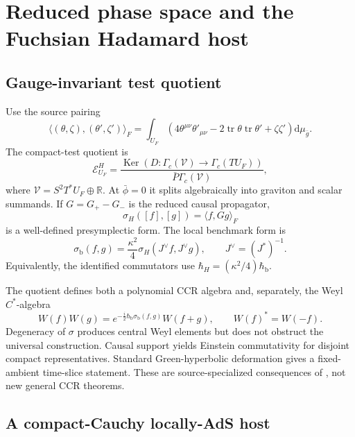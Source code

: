 \documentclass[11pt]{article}
\theoremstyle{definition}
\theoremstyle{remark}
\newcommand{\U}{U_{F}}
\newcommand{\gbar}{\bar g}
\newcommand{\dd}{\mathrm d}
\newcommand{\Ker}{\operatorname{Ker}}
\newcommand{\cE}{\mathcal E}
\newcommand{\cV}{\mathcal V}
\newcommand{\hbarLB}{\hbar_{\mathrm{b}}}
\begin{document}
\section{Reduced phase space and the Fuchsian Hadamard host}

\subsection{Gauge-invariant test quotient}

Use the source pairing
\begin{equation}
 \langle(\theta,\zeta),(\theta',\zeta')\rangle_F
 =\int_{\U}\left(4\theta^{\mu\nu}\theta'_{\mu\nu}
 -2\operatorname{tr}\theta\operatorname{tr}\theta'+\zeta\zeta'\right)
 \dd\mu_{\gbar}.
 \label{eq:sourcepair}
\end{equation}
The compact-test quotient is
\begin{equation}
 \cE^H_{\U}=\frac{\Ker(D:\Gamma_c(\cV)\to\Gamma_c(T\U))}
 {\bar P\Gamma_c(\cV)},
 \label{eq:testquotient}
\end{equation}
where $\cV=S^2T^*\U\oplus\mathbb R$.  At $\bar\phi=0$ it splits algebraically into
graviton and scalar summands.  If $G=G_+-G_-$ is the reduced causal propagator,
\begin{equation}
 \sigma_H([f],[g])=\langle f,Gg\rangle_F
 \label{eq:sigmaH}
\end{equation}
is a well-defined presymplectic form.  The local benchmark form is
\begin{equation}
 \sigma_{\mathrm{b}}(f,g)=\frac{\kappa^2}{4}
 \sigma_H(J^\vee f,J^\vee g),
 \qquad J^\vee=(J^*)^{-1}.
 \label{eq:sigmaLB}
\end{equation}
Equivalently, the identified commutators use
$\hbar_H=(\kappa^2/4)\hbarLB$.

The quotient defines both a polynomial CCR algebra and, separately, the Weyl
$C^*$-algebra
\begin{equation}
 W(f)W(g)=e^{-\frac{i}{2}\hbarLB\sigma_{\mathrm{b}}(f,g)}W(f+g),
 \qquad W(f)^*=W(-f).
 \label{eq:weyl}
\end{equation}
Degeneracy of $\sigma$ produces central Weyl elements but does not obstruct the
universal construction.  Causal support yields Einstein commutativity for disjoint
compact representatives.  Standard Green-hyperbolic deformation gives a
fixed-ambient time-slice statement.  These are source-specialized consequences of
\cite{Hack2014,HackSchenkel2013,FewsterHunt2013}, not new general CCR theorems.

\subsection{A compact-Cauchy locally-AdS host}
\end{document}
